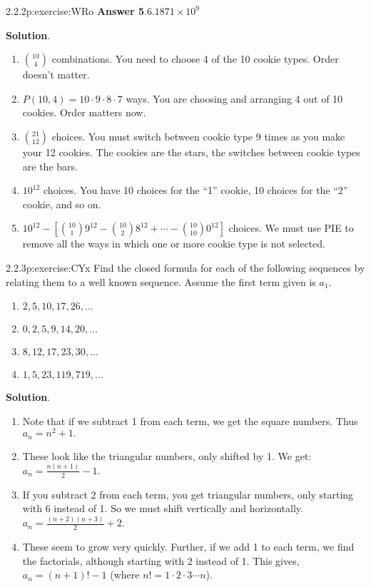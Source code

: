 \documentclass[twoside,11pt,]{book}
\newcommand{\blocktitlefont}{\relax}
\numberwithin{equation}{chapter}
\begin{document}
\begin{divisionsolution}{2.2.2}{}{p:exercise:WRo}
\noindent\textbf{\blocktitlefont Answer 5}.\quad{}\(6.1871\times 10^{9}\)%
\par\smallskip%
\noindent\textbf{\blocktitlefont Solution}.\quad{}%
\begin{enumerate}[label=(\alph*)]
\item{}\({10 \choose 4}\) combinations. You need to choose 4 of the 10 cookie types. Order doesn't matter.%
\item{}\(P(10, 4) = 10 \cdot 9 \cdot 8 \cdot 7\) ways. You are choosing and arranging 4 out of 10 cookies. Order matters now.%
\item{}\({21 \choose 12}\) choices. You must switch between cookie type 9 times as you make your 12 cookies. The cookies are the stars, the switches between cookie types are the bars.%
\item{}\(10^{12}\) choices. You have 10 choices for the ``1'' cookie, 10 choices for the ``2'' cookie, and so on.%
\item{}\(10^{12} - \left[{10 \choose 1}9^{12} - {10 \choose 2}8^{12} + \cdots - {10 \choose 10}0^{12} \right]\) choices. We must use PIE to remove all the ways in which one or more cookie type is not selected.%
\end{enumerate}
%
\end{divisionsolution}%
\begin{divisionsolution}{2.2.3}{}{p:exercise:CYx}%
Find the closed formula for each of the following sequences by relating them to a well known sequence. Assume the first term given is \(a_1\text{.}\)%
\begin{enumerate}[label=(\alph*)]
\item{}\(2, 5, 10, 17, 26, \ldots\)%
\item{}\(0, 2, 5, 9, 14, 20, \ldots\)%
\item{}\(8, 12, 17, 23, 30,\ldots\)%
\item{}\(1, 5, 23, 119, 719,\ldots\)%
\end{enumerate}
%
\par\smallskip%
\noindent\textbf{\blocktitlefont Solution}.\quad{}%
\begin{enumerate}[label=(\alph*)]
\item{}Note that if we subtract 1 from each term, we get the square numbers. Thus \(a_n = n^2 + 1\text{.}\)%
\item{}These look like the triangular numbers, only shifted by 1. We get: \(a_n = \frac{n(n+1)}{2} - 1\text{.}\)%
\item{}If you subtract 2 from each term, you get triangular numbers, only starting with 6 instead of 1. So we must shift vertically and horizontally. \(a_n = \frac{(n+2)(n+3)}{2} + 2\text{.}\)%
\item{}These seem to grow very quickly. Further, if we add 1 to each term, we find the factorials, although starting with 2 instead of 1. This gives, \(a_n = (n+1)! - 1\) (where \(n! = 1 \cdot 2 \cdot 3 \cdots n\)).%
\end{enumerate}
%
\end{divisionsolution}%
\end{document}

